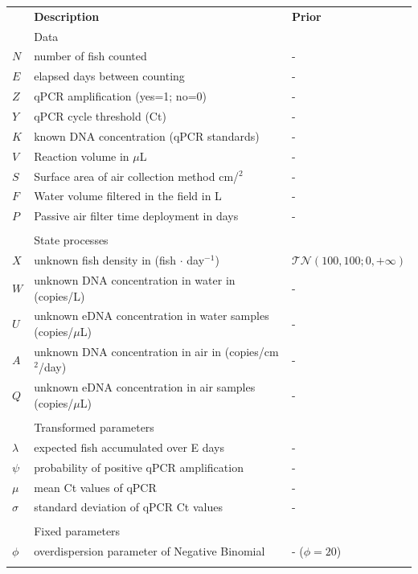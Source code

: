 \documentclass{article}
\begin{document}
\clearpage
\begin{table}
    \centering
    \begin{tabular}{lll}
         & \textbf{Description} & \textbf{Prior} \\
&Data & \\
\hline
$N$ & number of fish counted & - \\
$E$ & elapsed days between counting & - \\
$Z$ & qPCR amplification (yes=1; no=0) & - \\
$Y$ & qPCR cycle threshold (Ct) & - \\
$K$ & known DNA concentration (qPCR standards) & - \\
$V$ & Reaction volume in $\mu$L & - \\
$S$ & Surface area of air collection method cm/$^2$ & - \\
$F$&Water volume filtered in the field in L & -\\
$P$&Passive air filter time deployment in days & -\\

&&\\
&State processes&\\
\hline
$X$ & unknown fish density in (fish $\cdot$ day$^{-1}$) & $\mathcal{TN}(100,100;0,+\infty)$ \\
$W$ & unknown DNA concentration in water in (copies/L) & - \\
$U$&unknown eDNA concentration in water samples (copies/$\mu$L) & - \\
$A$ & unknown DNA concentration in air in (copies/cm$^2$/day) & - \\
$Q$ & unknown eDNA concentration in air samples (copies/$\mu$L) & - \\

&&\\

&Transformed parameters&\\
\hline
$\lambda$& expected fish accumulated over E days & - \\
$\psi$& probability of positive qPCR amplification & - \\
$\mu$& mean Ct values of qPCR & - \\
$\sigma$& standard deviation of qPCR Ct values & - \\
&&\\

&Fixed parameters&\\
\hline
$\phi$& overdispersion parameter of Negative Binomial & - ($\phi = 20$) \\
&&\\


\end{tabular}
\end{table}
\end{document}
